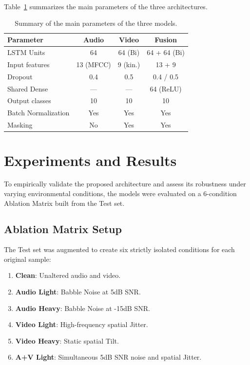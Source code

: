 \documentclass[sigconf,screen,nonacm]{acmart}
\begin{document}
Table~\ref{tab:params} summarizes the main parameters of the three architectures.

\begin{table}[ht]
  \caption{Summary of the main parameters of the three models.}
  \label{tab:params}
  \centering
  \begin{tabular}{l c c c}
    \toprule
    \textbf{Parameter}  & \textbf{Audio} & \textbf{Video} & \textbf{Fusion} \\
    \midrule
    LSTM Units          & 64             & 64 (Bi)        & 64 + 64 (Bi)    \\
    Input features      & 13 (MFCC)      & 9 (kin.)       & 13 + 9          \\
    Dropout             & 0.4            & 0.5            & 0.4 / 0.5       \\
    Shared Dense        & ---            & ---            & 64 (ReLU)       \\
    Output classes      & 10             & 10             & 10              \\
    Batch Normalization & Yes            & Yes            & Yes             \\
    Masking             & No             & Yes            & Yes             \\
    \bottomrule
  \end{tabular}
\end{table}

\section{Experiments and Results}

To empirically validate the proposed architecture and assess its robustness under varying environmental conditions, the models were evaluated on a 6-condition Ablation Matrix built from the Test set.

\subsection{Ablation Matrix Setup}
The Test set was augmented to create six strictly isolated conditions for each original sample:
\begin{enumerate}
  \item \textbf{Clean}: Unaltered audio and video.
  \item \textbf{Audio Light}: Babble Noise at 5dB SNR.
  \item \textbf{Audio Heavy}: Babble Noise at -15dB SNR.
  \item \textbf{Video Light}: High-frequency spatial Jitter.
  \item \textbf{Video Heavy}: Static spatial Tilt.
  \item \textbf{A+V Light}: Simultaneous 5dB SNR noise and spatial Jitter.
\end{enumerate}
\end{document}

